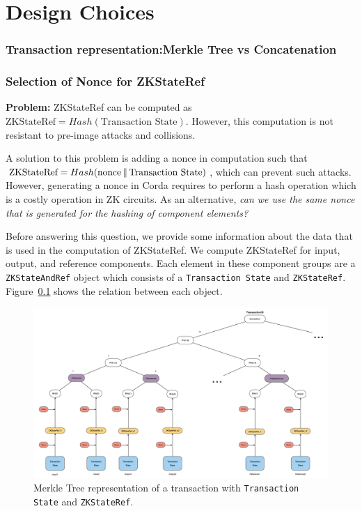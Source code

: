 \chapter*{Design Choices}

\subsection{Transaction representation:Merkle Tree vs Concatenation}

\subsection{Selection of Nonce for ZKStateRef}

\textbf{Problem:} ZKStateRef can be computed as $\text{ZKStateRef} = Hash(\text{Transaction State})$.
However, this computation is not resistant to pre-image attacks and collisions.

A solution to this problem is adding a nonce in computation such that $\text{ZKStateRef} = Hash(\text{nonce} \operatorname{\mathbin\Vert} \text{Transaction State})$, which can prevent such attacks.
However, generating a nonce in Corda requires to perform a hash operation which is a costly operation in ZK circuits.
As an alternative, \textit{can we use the same nonce that is generated for the hashing of component elements?}

Before answering this question, we provide some information about the data that is used in the computation of ZKStateRef.
We compute ZKStateRef for input, output, and reference components.
Each element in these component groups are a \texttt{ZKStateAndRef} object which consists of a \texttt{Transaction State} and \texttt{ZKStateRef}.
Figure~\ref{fig:tree_ts} shows the relation between each object.

\begin{figure}[ht]
\includegraphics[width=\textwidth]{Appendix1/images/tree_ts}
\caption{Merkle Tree representation of a transaction with \texttt{Transaction State} and \texttt{ZKStateRef}.}
\label{fig:tree_ts}
\end{figure}

